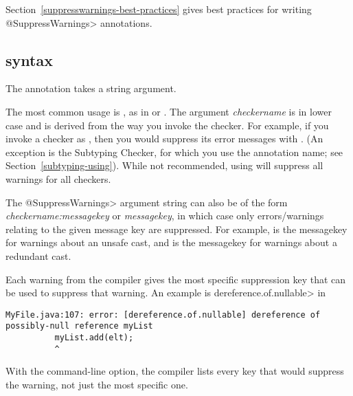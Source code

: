 Section~\ref{suppresswarnings-best-practices} gives best practices for
writing \<@SuppressWarnings> annotations.


\subsection{ syntax\label{suppresswarnings-annotation-syntax}}

The  annotation takes a string argument.

The most common usage is , as
in  or
.  The argument \emph{checkername} is
in lower case and is derived from the way you invoke the checker.  For
example, if you invoke a checker as
,
then you would suppress its error messages with
.  (An exception is the Subtyping
Checker, for which you use the annotation name; see
Section~\ref{subtyping-using}).  While not recommended, using
 will suppress all warnings for all
checkers.

The \<@SuppressWarnings> argument string can also  be of the form
\emph{checkername:messagekey} or \emph{messagekey}, in which case only
errors/warnings relating to the given message key are suppressed.  For example,
 is the messagekey for warnings about an unsafe cast, and
 is the messagekey for warnings about a redundant cast.

Each warning from the compiler gives the most specific
suppression key that can be used to suppress that warning.
An example is \<dereference.of.nullable> in

\begin{smaller}
\begin{Verbatim}
MyFile.java:107: error: [dereference.of.nullable] dereference of possibly-null reference myList
          myList.add(elt);
          ^
\end{Verbatim}
\end{smaller}

\noindent
With the  command-line option,
the compiler lists every key that would suppress the warning,
not just the most specific one.

%


